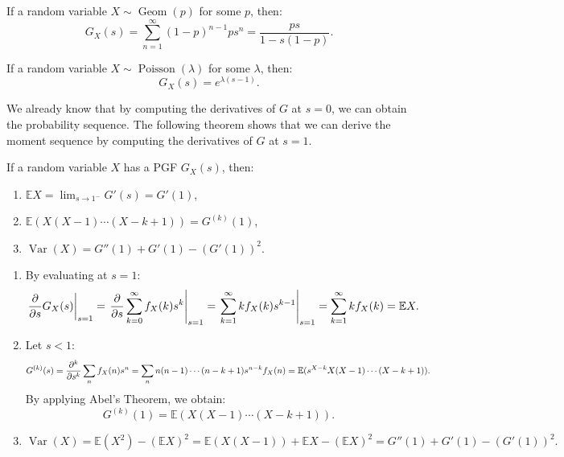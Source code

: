 \documentclass{huhtakm-template-book-v2}
\newcommand{\expect}{\mathbb{E}}
\DeclareMathOperator{\Geom}{Geom}
\DeclareMathOperator{\Poisson}{Poisson}
\DeclareMathOperator{\Var}{Var}
\begin{document}
    \begin{eg}
        If a random variable $X \sim \Geom(p)$ for some $p$, then:
        \begin{equation*}
            G_{X}(s) = \sum_{n = 1}^{\infty}(1-p)^{n-1}ps^{n} = \frac{ps}{1-s(1-p)}.
        \end{equation*}
    \end{eg}
    \begin{eg}
        If a random variable $X \sim \Poisson(\lambda)$ for some $\lambda$, then:
        \begin{equation*}
            G_{X}(s) = e^{\lambda(s-1)}.
        \end{equation*}
    \end{eg}
    \newpage

    We already know that by computing the derivatives of $G$ at $s = 0$, we can obtain the probability sequence. The following theorem shows that we can derive the moment sequence by computing the derivatives of $G$ at $s = 1$.
    \begin{thm}
        If a random variable $X$ has a PGF $G_{X}(s)$, then:
        \begin{enumerate}
            \item $\expect{X} = \lim_{s \to 1^{-}}G'(s) = G'(1)$,
            \item $\expect(X(X-1)\cdots(X-k+1)) = G^{(k)}(1)$,
            \item $\Var(X) = G''(1)+G'(1)-(G'(1))^{2}$.
        \end{enumerate}
    \end{thm}
    \begin{proofing}
        \begin{enumerate}
            \item By evaluating at $s = 1$:
            \begin{equation*}
                \left.\pdv*{G_{X}(s)}{s}\right|_{s = 1} = \left.\pdv*{\sum_{k = 0}^{\infty}f_{X}(k)s^{k}}{s}\right|_{s = 1} = \left.\sum_{k = 1}^{\infty}kf_{X}(k)s^{k-1}\right|_{s = 1} = \sum_{k = 1}^{\infty}kf_{X}(k) = \expect{X}.
            \end{equation*}
            \item Let $s < 1$:
            \begin{equation*}
                G^{(k)}(s) = \pdv*[order = {k}]{\sum_{n}f_{X}(n)s^{n}}{s} = \sum_{n}n(n-1)\cdots(n-k+1)s^{n-k}f_{X}(n) = \expect(s^{X-k}X(X-1)\cdots(X-k+1)).
            \end{equation*}
            By applying Abel's Theorem, we obtain:
            \begin{equation*}
                G^{(k)}(1) = \expect(X(X-1)\cdots(X-k+1)).
            \end{equation*}
            \item 
            \begin{equation*}
                \Var(X) = \expect(X^{2})-(\expect{X})^{2} = \expect(X(X-1))+\expect{X}-(\expect{X})^{2} = G''(1)+G'(1)-(G'(1))^{2}.
            \end{equation*}
        \end{enumerate}
    \end{proofing}
\end{document}
